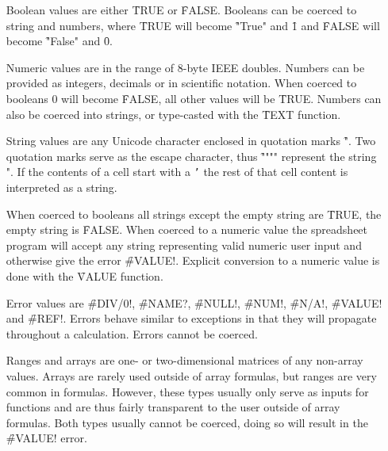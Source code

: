 \begin{itemize}
\item[Boolean] values are either \f{TRUE} or \f{FALSE}. Booleans can be coerced to string and numbers, where \f{TRUE} will become \f{"True"} and \f{1} and \f{FALSE} will become \f{"False"} and \f{0}.
\item[Numeric] values are in the range of 8-byte IEEE doubles. Numbers can be provided as integers, decimals or in scientific notation.
When coerced to booleans 0 will become \f{FALSE}, all other values will be \f{TRUE}. Numbers can also be coerced into strings, or type-casted with the \f{TEXT} function.

\item[String] values are any Unicode character enclosed in quotation marks \f{"}.
Two quotation marks serve as the escape character, thus \f{""""} represent the string ".
If the contents of a cell start with a \texttt{'} the rest of that cell content is interpreted as a string.

When coerced to booleans all strings except the empty string are \f{TRUE}, the empty string is \f{FALSE}.
When coerced to a numeric value the spreadsheet program will accept any string representing valid numeric user input and otherwise give the error \f{\#VALUE!}. Explicit conversion to a numeric value is done with the \f{VALUE} function.

\item[Error] values are \f{\#DIV/0!}, \f{\#NAME?}, \f{\#NULL!}, \f{\#NUM!}, \f{\#N/A!}, \f{\#VALUE!} and \f{\#REF!}.
Errors behave similar to exceptions in that they will propagate throughout a calculation. Errors cannot be coerced.

\item[Ranges and arrays] are one- or two-dimensional matrices of any non-array values. Arrays are rarely used outside of array formulas, but ranges are very common in formulas.
However, these types usually only serve as inputs for functions and are thus fairly transparent to the user outside of array formulas.
Both types usually cannot be coerced, doing so will result in the \f{\#VALUE!} error.
\end{itemize}

